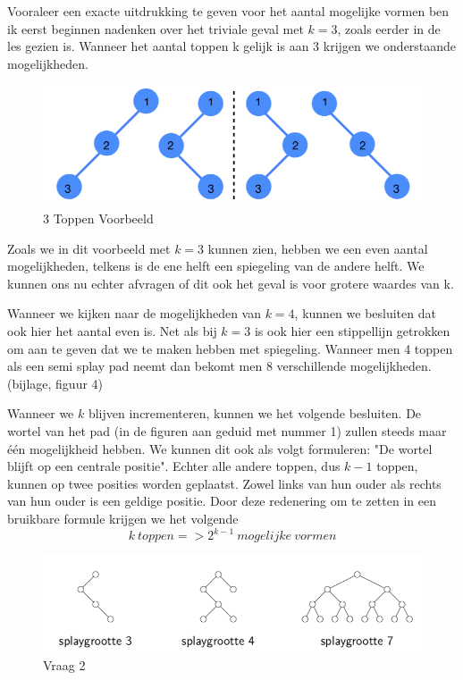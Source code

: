 \documentclass[dutch, 11pt]{report}
\begin{document}
Vooraleer een exacte uitdrukking te geven voor het aantal mogelijke vormen ben ik eerst beginnen nadenken over het triviale geval met $k=3$, zoals eerder in de les gezien is. Wanneer het aantal toppen k gelijk is aan 3 krijgen we onderstaande mogelijkheden.\newline

\begin{figure}[h]
\caption{3 Toppen Voorbeeld}
\includegraphics[width=\textwidth]{3_Toppen}
\centering
\end{figure}

Zoals we in dit voorbeeld met $k=3$ kunnen zien, hebben we een even aantal mogelijkheden, telkens is de ene helft een spiegeling van de andere helft. We kunnen ons nu echter afvragen of dit ook het geval is voor grotere waardes van k.

Wanneer we kijken naar de mogelijkheden van $k=4$, kunnen we besluiten dat ook hier het aantal even is. Net als bij $k=3$ is ook hier een stippellijn getrokken om aan te geven dat we te maken hebben met spiegeling. Wanneer men 4 toppen als een semi splay pad neemt dan bekomt men 8 verschillende mogelijkheden. (bijlage, figuur 4)

Wanneer we $k$ blijven incrementeren, kunnen we het volgende besluiten. De wortel van het pad (in de figuren aan geduid met nummer 1) zullen steeds maar één mogelijkheid hebben. We kunnen dit ook als volgt formuleren: "De wortel blijft op een centrale positie". Echter alle andere toppen, dus $k - 1$ toppen, kunnen op twee posities worden geplaatst. Zowel links van hun ouder als rechts van hun ouder is een geldige positie. Door deze redenering om te zetten in een bruikbare formule krijgen we het volgende
$$
k\ toppen => 2^{k-1}\ mogelijke\ vormen
$$

\begin{figure}[h]
\caption{Vraag 2}
\includegraphics[width=\textwidth]{Vraag2}
\centering
\end{figure}
\newpage
\end{document}
